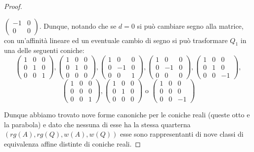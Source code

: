 \begin{proof}
\begin{description}
 $\left(\begin{smallmatrix} -1 & 0 \\ 0 & 0 \end{smallmatrix}\right)$. Dunque, notando che se $d=0$ si può cambiare segno alla matrice, con
 un'affinità lineare ed un eventuale cambio di segno si può trasformare $Q_1$ in una delle seguenti coniche:
 $$\left( \begin{array}{ccc}
   1 & 0 & 0\\
   0 & 1 & 0\\
   0 & 0 & 1
  \end{array} \right) ,
  \left( \begin{array}{ccc}
   1 & 0 & 0\\
   0 & 1 & 0\\
   0 & 0 & 0
  \end{array} \right) ,
  \left( \begin{array}{ccc}
   1 & 0 & 0\\
   0 & -1 & 0\\
   0 & 0 & 1
  \end{array} \right) ,
  \left( \begin{array}{ccc}
   1 & 0 & 0\\
   0 & -1 & 0\\
   0 & 0 & 0
  \end{array} \right) ,
  \left( \begin{array}{ccc}
   1 & 0 & 0\\
   0 & 1 & 0\\
   0 & 0 & -1
  \end{array} \right) ,$$
  $$\left( \begin{array}{ccc}
   1 & 0 & 0\\
   0 & 0 & 0\\
   0 & 0 & 1
  \end{array} \right) ,
  \left( \begin{array}{ccc}
   1 & 0 & 0\\
   0 & 1 & 0\\
   0 & 0 & 0
  \end{array} \right) \text{ o }
  \left( \begin{array}{ccc}
   1 & 0 & 0\\
   0 & 0 & 0\\
   0 & 0 & -1
  \end{array} \right)$$
 \end{description}
 Dunque abbiamo trovato nove forme canoniche per le coniche reali (queste otto e la parabola) e dato che nessuna di esse ha la stessa quarterna
 $(rg(A),rg(Q),w(A),w(Q))$ esse sono rappresentanti di nove classi di equivalenza affine distinte di coniche reali.
\end{proof}
